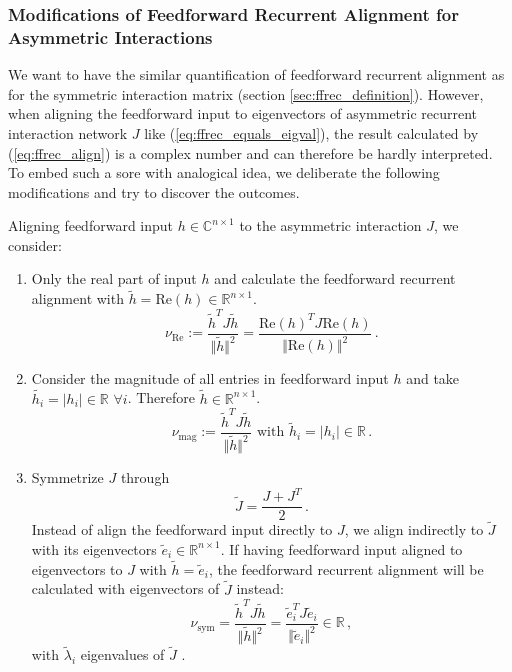 \documentclass[11pt]{article}
\begin{document}
	\subsubsection{Modifications of Feedforward Recurrent Alignment for Asymmetric Interactions} \label{sec:modify_ffrec_alignment_score}
	We want to have the similar quantification of feedforward recurrent alignment as for the symmetric interaction matrix (section \ref{sec:ffrec_definition}). However, when aligning the feedforward input to eigenvectors of asymmetric recurrent interaction network $J$ like (\ref{eq:ffrec_equals_eigval}), the result calculated by (\ref{eq:ffrec_align}) is a complex number and can therefore be hardly interpreted. To embed such a sore with analogical idea, we deliberate the following modifications and try to discover the outcomes. 
	
	Aligning feedforward input $h \in \mathbb{C}^{n \times 1}$ to the asymmetric interaction $J$, we consider:
		\begin{enumerate}
			\item \label{sec:modicication_real_part} Only the real part of input $h$ and calculate the feedforward recurrent alignment with $\tilde{h} = \text{Re}(h) \in \mathbb{R}^{n \times 1}$.
				\begin{equation} \label{eq:ffrec_real_part}
					\nu_{\text{Re}} := \frac{\tilde{h}^T J \tilde{h}}{\Vert \tilde{h} \Vert^2} = \frac{\text{Re}(h)^T J \text{Re}(h)}{\Vert \text{Re}(h)\Vert^2} \, .
				\end{equation}
			\item \label{sec:modification_magnitude} Consider the magnitude of all entries in feedforward input $h$ and take $\tilde{h_i} = \vert h_i \vert \in \mathbb{R} \, \, \forall i$. Therefore $\tilde{h} \in \mathbb{R}^{n \times 1}$.
				\begin{equation} \label{eq:ffrec_mag}
					\nu_{\text{mag}} := \frac{\tilde{h}^T J \tilde{h}}{\Vert \tilde{h} \Vert^2} \text{ with } \tilde{h}_i = \vert h_i \vert \in \mathbb{R} \, .
				\end{equation}
			\item \label{sec:modification_symmetrized} Symmetrize $J$ through
				\begin{equation} \label{eq:symmetrized_J}
					\tilde{J} = \frac{J + J^T}{2} \, .
				\end{equation}
				Instead of align the feedforward input directly to $J$, we align indirectly to $\tilde{J}$ with its eigenvectors $\tilde{e}_i \in \mathbb{R}^{n \times 1}$. If having feedforward input aligned to eigenvectors to $J$ with $\tilde{h} = \tilde{e}_i $, the feedforward recurrent alignment will be calculated with eigenvectors of $\tilde{J}$ instead:
				\begin{equation} \label{eq:ffrec_symmetrized}
					\nu_{\text{sym}} =  \frac{\tilde{h}^T J \tilde{h}}{\Vert \tilde{h} \Vert^2} = \frac{\tilde{e}_i^T J \tilde{e}_i}{\Vert \tilde{e}_i \Vert^2} \in \mathbb{R} \, ,
				\end{equation}
				with $\tilde{\lambda}_i$ eigenvalues of $\tilde{J}$ . 
		\end{enumerate}
	
\end{document}
